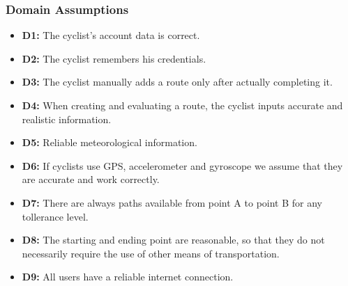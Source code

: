 \subsubsection{Domain Assumptions}
\begin{itemize}
 \item \textbf{D1:} The cyclist's account data is correct.
 \item \textbf{D2:} The cyclist remembers his credentials.
 \item \textbf{D3:} The cyclist manually adds a route only after actually completing it.
 \item \textbf{D4:} When creating and evaluating a route, the cyclist inputs accurate and realistic information.
 \item \textbf{D5:} Reliable meteorological information.
 \item \textbf{D6:} If cyclists use GPS, accelerometer and gyroscope we assume that they are accurate and work correctly. 
 \item \textbf{D7:} There are always paths available from point A to point B for any tollerance level.
 \item \textbf{D8:} The starting and ending point are reasonable, so that they do not necessarily require the use of other means of transportation.
 \item \textbf{D9:} All users have a reliable internet connection.
\end{itemize}